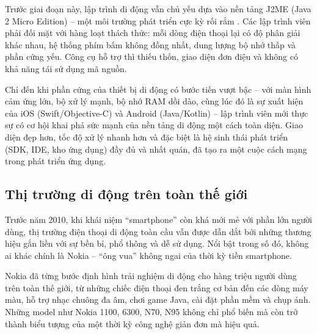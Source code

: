 \begin{flushleft}
\hspace*{0.8cm}Trước giai đoạn này, lập trình di động vẫn chủ yếu dựa vào nền tảng J2ME (Java 2 Micro Edition) – một môi trường phát triển cực kỳ rối rắm \cite{j2me-limitations}. Các lập trình viên phải đối mặt với hàng loạt thách thức: mỗi dòng điện thoại lại có độ phân giải khác nhau, hệ thống phím bấm không đồng nhất, dung lượng bộ nhớ thấp và phần cứng yếu. Công cụ hỗ trợ thì thiếu thốn, giao diện đơn điệu và không có khả năng tái sử dụng mã nguồn.
\end{flushleft}

\begin{flushleft}
\hspace*{0.8cm}Chỉ đến khi phần cứng của thiết bị di động có bước tiến vượt bậc – với màn hình cảm ứng lớn, bộ xử lý mạnh, bộ nhớ RAM dồi dào, cùng lúc đó là sự xuất hiện của iOS (Swift/Objective-C) và Android (Java/Kotlin) – lập trình viên mới thực sự có cơ hội khai phá sức mạnh của nền tảng di động một cách toàn diện. Giao diện đẹp hơn, tốc độ xử lý nhanh hơn và đặc biệt là hệ sinh thái phát triển (SDK, IDE, kho ứng dụng) đầy đủ và nhất quán, đã tạo ra một cuộc cách mạng trong phát triển ứng dụng.
\end{flushleft}

\subsection{Thị trường di động trên toàn thế giới}
\renewcommand{\labelitemi}{--}    
\begin{flushleft}
  \hspace*{0.8cm}Trước năm 2010, khi khái niệm “smartphone” còn khá mới mẻ với phần lớn người dùng, thị trường điện thoại di động toàn cầu vẫn được dẫn dắt bởi những thương hiệu gắn liền với sự bền bỉ, phổ thông và dễ sử dụng. Nổi bật trong số đó, không ai khác chính là Nokia – “ông vua” không ngai của thời kỳ tiền smartphone.
  \end{flushleft}
  
  \begin{flushleft}
  \hspace*{0.8cm}Nokia đã từng bước định hình trải nghiệm di động cho hàng triệu người dùng trên toàn thế giới, từ những chiếc điện thoại đen trắng cơ bản đến các dòng máy màu, hỗ trợ nhạc chuông đa âm, chơi game Java, cài đặt phần mềm và chụp ảnh. Những model như Nokia 1100, 6300, N70, N95 không chỉ phổ biến mà còn trở thành biểu tượng của một thời kỳ công nghệ giản đơn mà hiệu quả.
  \end{flushleft}
  
